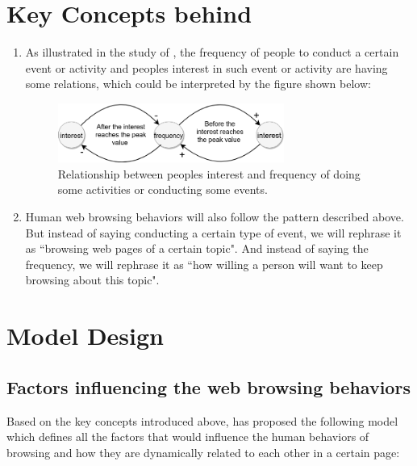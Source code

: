\documentclass[12pt]{report}
\begin{document}
\section{Key Concepts behind}
\begin{enumerate}
\item As illustrated in the study of \citet{interest-theo}, the frequency of people to conduct a certain event or activity and people\textquotesingle s interest in such event or activity are having some relations, which could be interpreted by the figure shown below:

\begin{figure}[h!]
  \centering
  \includegraphics[width=0.7\textwidth]{./pictures/interest-freq}
  \caption{Relationship between people\textquotesingle s interest and frequency of doing some activities or conducting some events.}
\end{figure}

\item Human web browsing behaviors will also follow the pattern described above. But instead of saying conducting a certain type of event, we will rephrase it as ``browsing web pages of a certain topic". And instead of saying the frequency, we will rephrase it as ``how willing a person will want to keep browsing about this topic".
\end{enumerate}

\section{Model Design}
\subsection{Factors influencing the web browsing behaviors} \label{factor}
Based on the key concepts introduced above, \citet{yang} has proposed the following model which defines all the factors that would influence the human behaviors of browsing and how they are dynamically related to each other in a certain page:
\end{document}
